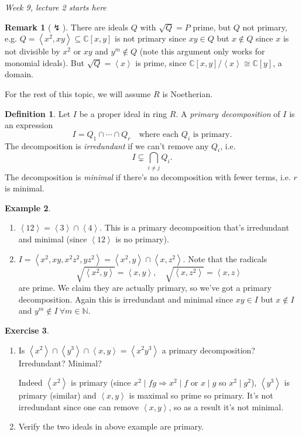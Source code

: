\documentclass[a4paper]{article}
\newcommand{\la}{\left\langle}
\newcommand{\ra}{\right\rangle}
\newcommand{\C}{\mathbb C}
\theoremstyle{definition}
\newtheorem{defn}{Definition}[subsection]
\newtheorem{example}[defn]{Example}
\newtheorem{exe}[defn]{Exercise}
\newtheorem*{remark}{Remark}
\begin{document}
\begin{flushright}
\textit{Week 9, lecture 2 starts here}
\end{flushright}

\begin{remark}[$\lightning$]
There are ideals $Q$ with $\sqrt Q=P$ prime, but $Q$ not primary, e.g. $Q=\la x^2,xy\ra\subseteq\C[x,y]$ is not primary since $xy\in Q$ but $x\notin Q$ since $x$ is not divisible by $x^2$ or $xy$ and $y^m\notin Q$ (note this argument only works for monomial ideals). But $\sqrt Q=\la x\ra$ is prime, since $\C[x,y]/\la x\ra\cong\C[y]$, a domain.
\end{remark}

For the rest of this topic, we will assume $R$ is Noetherian.

\begin{defn}
Let $I$ be a proper ideal in ring $R$. A \textit{primary decomposition} of $I$ is an expression
\[
I=Q_1\cap \cdots \cap Q_r\quad\text{where each }Q_i\text{ is primary}.
\]
The decomposition is \textit{irredundant} if we can't remove any $Q_i$, i.e.
\[
I\subsetneq \bigcap_{i\neq j}Q_i .
\]
The decomposition is \textit{minimal} if there's no decomposition with fewer terms, i.e. $r$ is minimal.
\end{defn}

\begin{example}
\begin{enumerate}
\item $\la 12\ra=\la 3\ra\cap\la 4\ra$. This is a primary decomposition that's irredundant and minimal (since $\la 12\ra$ is no primary).
\item $I=\la x^2,xy,x^2 z^2,yz^2\ra=\la x^2,y\ra\cap\la x,z^2\ra$. Note that the radicals
\[
\sqrt{\la x^2,y\ra}=\la x,y\ra,\quad \sqrt{\la x,z^2\ra}=\la x,z\ra
\]
are prime. We claim they are actually primary, so we've got a primary decomposition. Again this is irredundant and minimal since $xy\in I$ but $x\notin I$ and $y^m\notin I \ \forall m\in\mathbb N$.
\end{enumerate}
\end{example}

\begin{exe}
\begin{enumerate}
\item Is $\la x^2\ra\cap\la y^3\ra\cap\la x,y\ra=\la x^2 y^3\ra$ a primary decomposition? Irredundant? Minimal?

Indeed $\la x^2\ra$ is primary (since $x^2\mid fg\Rightarrow x^2\mid f$ or $x\mid g$ so $x^2\mid g^2$), $\la y^3\ra$ is primary (similar) and $\la x,y\ra$ is maximal so prime so primary. It's not irredundant since one can remove $\la x,y\ra$, so as a result it's not minimal.
\item Verify the two ideals in above example are primary.
\end{enumerate}
\end{exe}
\end{document}
